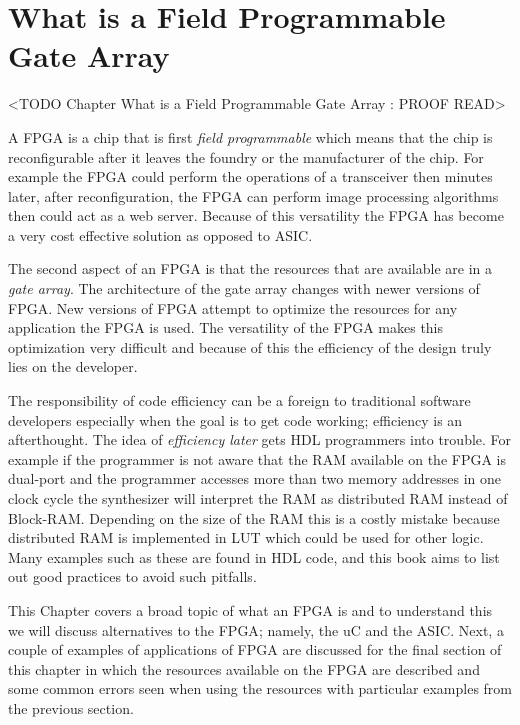 \chapter{What is a Field Programmable Gate Array}
	<TODO Chapter What is a Field Programmable Gate Array : PROOF READ>

A \ac{FPGA} is a chip that is first \emph{field programmable} which means that the chip is reconfigurable after it leaves the foundry or the manufacturer of the chip. For example the \ac{FPGA} could perform the operations of a transceiver then minutes later, after reconfiguration, the \ac{FPGA} can perform image processing algorithms then could act as a web server. Because of this versatility the \ac{FPGA} has become a very cost effective solution as opposed to \ac{ASIC}.

The second aspect of an \ac{FPGA} is that the resources that are available are in a \emph{gate array}. The architecture of the gate array changes with newer versions of \ac{FPGA}. New versions of \ac{FPGA} attempt to optimize the resources for any application the \ac{FPGA} is used. The versatility of the \ac{FPGA} makes this optimization very difficult and because of this the efficiency of the design truly lies on the developer.

The responsibility of code efficiency can be a foreign to traditional software developers especially when the goal is to get code working; efficiency is an afterthought. The idea of \emph{efficiency later} gets \ac{HDL} programmers into trouble. For example if the programmer is not aware that the \ac{RAM} available on the \ac{FPGA} is dual-port and the programmer accesses more than two memory addresses in one clock cycle the synthesizer will interpret the \ac{RAM} as distributed \ac{RAM} instead of Block-\ac{RAM}. Depending on the size of the \ac{RAM} this is a costly mistake because distributed \ac{RAM} is implemented in \ac{LUT} which could be used for other logic. Many examples such as these are found in \ac{HDL} code, and this book aims to list out good practices to avoid such pitfalls.

This Chapter covers a broad topic of what an \ac{FPGA} is and to understand this we will discuss alternatives to the \ac{FPGA}; namely, the \ac{uC} and the \ac{ASIC}. Next, a couple of examples of applications of \ac{FPGA} are discussed for the final section of this chapter in which the resources available on the \ac{FPGA} are described and some common errors seen when using the resources with particular examples from the previous section. 

